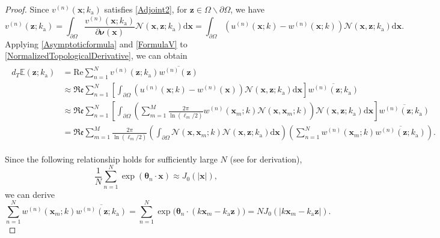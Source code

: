 \documentclass[10pt,a4paper]{amsart}
\newcommand{\ka}{k_{\mathrm{a}}}
\newcommand{\mx}{\mathbf{x}}
\newcommand{\mz}{\mathbf{z}}
\newcommand{\p}{\partial}
\newcommand{\rd}{\mathrm{d}}
\newcommand{\vn}{\boldsymbol{\nu}}
\newcommand{\vt}{\boldsymbol{\theta}}
\begin{document}
\begin{proof}
Since $v^{(n)}(\mx;\ka)$ satisfies \eqref{Adjoint2}, for $\mz\in\Omega\backslash\p\Omega$, we have
\begin{equation}\label{FormulaV}
v^{(n)}(\mz;\ka)=\int_{\p\Omega}\frac{v^{(n)}(\mx;\ka)}{\p\vn(\mx)}\mathcal{N}(\mx,\mz;\ka)\rd\mx=\int_{\p\Omega}\left(u^{(n)}(\mx;k)-w^{(n)}(\mx;k)\right)\mathcal{N}(\mx,\mz;\ka)\rd\mx.
\end{equation}
Applying \eqref{Asymptoticformula} and \eqref{FormulaV} to \eqref{NormalizedTopologicalDerivative}, we can obtain
\begin{align}
\begin{aligned}\label{Term}
d_T\mathbb{E}(\mz;\ka)&=\mathrm{Re}\sum_{n=1}^{N}v^{(n)}(\mz;\ka)\overline{w^{(n)}(\mz)}\\
&\approx\mathfrak{Re}\sum_{n=1}^{N}\left[\int_{\p\Omega}\left(u^{(n)}(\mx;k)-w^{(n)}(\mx)\right)\mathcal{N}(\mx,\mz;\ka)\rd\mx\right]\overline{w^{(n)}(\mz;\ka)}\\
&\approx\mathfrak{Re}\sum_{n=1}^{N}\left[\int_{\p\Omega}\left(\sum_{m=1}^{M}\frac{2\pi}{\ln(\ell_m/2)}w^{(n)}(\mx_m;k)\mathcal{N}(\mx,\mx_m;k)\right)\mathcal{N}(\mx,\mz;\ka)\rd\mx\right]\overline{w^{(n)}(\mz;\ka)}\\
&=\mathfrak{Re}\sum_{m=1}^{M}\frac{2\pi}{\ln(\ell_m/2)}\left(\int_{\p\Omega}\mathcal{N}(\mx,\mx_m;k)\mathcal{N}(\mx,\mz;\ka)\rd\mx\right)\left(\sum_{n=1}^{N}w^{(n)}(\mx_m;k)\overline{w^{(n)}(\mz;\ka)}\right).
\end{aligned}
\end{align}

Since the following relationship holds for sufficiently large $N$ (see \cite{P-SUB3} for derivation),
\[\frac{1}{N}\sum_{n=1}^{N}\exp(\vt_n\cdot\mx)\approx J_0(|\mx|),\]
we can derive
\begin{equation}\label{Term1}
\sum_{n=1}^{N}w^{(n)}(\mx_m;k)\overline{w^{(n)}(\mz;\ka)}=\sum_{n=1}^{N}\exp\Big(\vt_n\cdot(k\mx_m-\ka\mz)\Big)=NJ_0(|k\mx_m-\ka\mz|).
\end{equation}


\end{proof}
\end{document}

